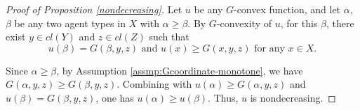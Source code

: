 \documentclass[a4paper, 11pt]{amsart}
\numberwithin{equation}{section}
\theoremstyle{plain}
\theoremstyle{definition}
\theoremstyle{remark}
\begin{document}
\vspace{0.3cm}


\begin{proof}[Proof of Proposition \ref{nondecreasing}]
	Let $u$ be any $G$-convex function, and let $\alpha$, $\beta$ be any two agent types in $X$ with $\alpha \ge \beta$. By $G$-convexity of $u$, for this $\beta$, there exist $y\in cl(Y)$ and $z \in cl(Z)$ such that 
	$$u(\beta)=G(\beta, y,z) \text{ and } u(x)\ge G(x, y,z) \text{ for any $x\in X$.}$$ 
	
	Since $\alpha \ge \beta$, by Assumption \ref{assmp:Gcoordinate-monotone}, we have $G(\alpha, y,z)\ge G(\beta,y,z)$. Combining with $u(\alpha)\ge G(\alpha, y,z)$ and $u(\beta) = G(\beta,y,z)$, one has $u(\alpha) \ge u(\beta)$. Thus, $u$ is nondecreasing.
\end{proof}

\vspace{0.3cm}
\end{document}
